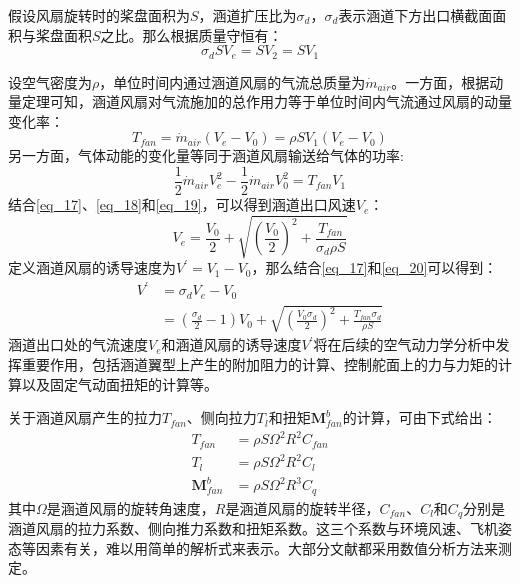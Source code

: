 假设风扇旋转时的桨盘面积为$S$，涵道扩压比为$\sigma_d$，$\sigma_d$表示涵道下方出口横截面面积与桨盘面积$S$之比。那么根据质量守恒有：
\begin{equation}
    \sigma_dSV_e=SV_2=SV_1
    \label{eq_17}
\end{equation}

设空气密度为$\rho$，单位时间内通过涵道风扇的气流总质量为$\dot{m}_{air}$。一方面，根据动量定理可知，涵道风扇对气流施加的总作用力等于单位时间内气流通过风扇的动量变化率：
\begin{equation}
    T_{fan}=\dot{m}_{air}(V_e-V_0)=\rho S V_1(V_e-V_0)
    \label{eq_18}
\end{equation}
另一方面，气体动能的变化量等同于涵道风扇输送给气体的功率:
\begin{equation}
    \frac{1}{2}\dot{m}_{air}V_e^2-\frac{1}{2}\dot{m}_{air}V_0^2=T_{fan}V_1
    \label{eq_19}
\end{equation}
结合\eqref{eq_17}、\eqref{eq_18}和\eqref{eq_19}，可以得到涵道出口风速$V_e$\cite{pereiraHoverWindtunnelTesting2008}：
\begin{equation}
    V_e=\frac{V_0}{2}+\sqrt{\left(\frac{V_0}{2}\right)^2+\frac{T_{fan}}{\sigma_d\rho S}}    \label{eq_20}
\end{equation}
定义涵道风扇的诱导速度为$V^{\prime}=V_1-V_0$，那么结合\eqref{eq_17}和\eqref{eq_20}可以得到：
\begin{equation}
    \begin{aligned}
    V^{\prime}&=\sigma_dV_e-V_0 \\
    &=\left(\frac{\sigma_d}{2}-1\right)V_0+\sqrt{\left(\frac{V_0\sigma_d}{2}\right)^2+\frac{T_{fan}\sigma_d}{\rho S}}
    \label{induced velocity}
    \end{aligned}
\end{equation}
涵道出口处的气流速度$V_e$和涵道风扇的诱导速度$V^{\prime}$将在后续的空气动力学分析中发挥重要作用，包括涵道翼型上产生的附加阻力的计算、控制舵面上的力与力矩的计算以及固定气动面扭矩的计算等。

关于涵道风扇产生的拉力$T_{fan}$、侧向拉力$T_{l}$和扭矩$\boldsymbol{M}_{fan}^b$的计算，可由下式给出\cite{luoNumericalAnalysisWind2024a}：
\begin{equation}
    \begin{aligned}
        T_{fan}&=\rho S \Omega^2R^2 C_{fan}\\
        T_{l}&=\rho S \Omega^2R^2 C_{l}\\
        \boldsymbol{M}_{fan}^b&=\rho S \Omega^2 R^3C_{q}
    \end{aligned}
    \label{eq_21}
\end{equation}
其中$\Omega$是涵道风扇的旋转角速度，$R$是涵道风扇的旋转半径，$C_{fan}$、$C_{l}$和$C_{q}$分别是涵道风扇的拉力系数、侧向推力系数和扭矩系数。这三个系数与环境风速、飞机姿态等因素有关，难以用简单的解析式来表示。大部分文献都采用数值分析方法来测定\cite{iiiNondimensionalModelingDuctedFan2012,choiStaticAnalysisSmall2012,luoNumericalAnalysisWind2024a}。

